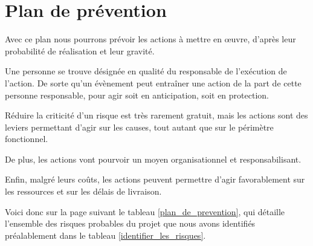 \documentclass[12pt]{article}
\begin{document}
\section{Plan de prévention}
Avec ce plan nous pourrons prévoir les actions à mettre en œuvre, d’après leur probabilité de réalisation et leur gravité.

Une personne se trouve désignée en qualité du responsable de l’exécution de l’action. De sorte qu’un évènement peut entraîner une action de la part de cette personne responsable, pour agir soit en anticipation, soit en protection.

Réduire la criticité d’un risque est très rarement gratuit, mais les actions sont des leviers permettant d’agir sur les causes, tout autant que sur le périmètre fonctionnel.

De plus, les actions vont pourvoir un moyen organisationnel et responsabilisant.

Enfin, malgré leurs coûts, les actions peuvent permettre d’agir favorablement sur les ressources et sur les délais de livraison. 

Voici donc sur la page suivant le tableau \ref{plan_de_prevention}, qui détaille l’ensemble des risques probables du projet que nous avons identifiés préalablement dans le tableau \ref{identifier_les_risques}.
\end{document}
